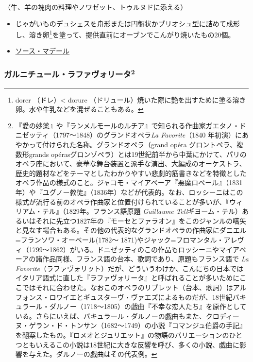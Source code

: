 \begin{recette}
（牛、羊の塊肉の料理やノワゼット、トゥルヌドに添える）

\begin{itemize}
\item
  じゃがいものデュシェスを舟形または円盤状かブリオシュ型に詰めて成形し、溶き卵\footnote{dorer
    （ドレ）\textless{} dorure
    （ドリュール）焼いた際に艶を出すために塗る溶き卵。水や牛乳などを混ぜることもある。}を塗って、提供直前にオーブンでこんがり焼いたもの20個。
\item
  \protect\hyperlink{sauce-madere}{ソース・マデール}
\end{itemize}

\hypertarget{garniture-a-la-favorite}{%
\subsubsection[ガルニチュール・ラファヴォリータ]{\texorpdfstring{ガルニチュール・ラファヴォリータ\footnote{『愛の妙薬』や『ランメルモールのルチア』で知られる作曲家ガエタノ・ドニゼッティ（1797〜1848）のグランドオペラ\emph{La
  Favorite}（1840
  年初演）にあやかって付けられた名称。グランドオペラ（grand opéra
  グロントペラ、複数形grands
  opérasグロンゾペラ）とは19世紀前半から中葉にかけて、パリのオペラ座において、豪華な舞台装置と派手な演出、大編成のオーケストラ、歴史的題材などをテーマとしたわかりやすい悲劇的筋書きなどを特徴としたオペラ作品の様式のこと。ジャコモ・マイアベーア『悪魔ロベール』（1831年）や『ユグノー教徒』（1836年）などが代表的。なお、ロッシーニはこの様式が流行る前のオペラ作曲家と位置付けられていることが多いが、『ウィリアム・テル』（1829年。フランス語原題
  \emph{Guillaume
  Tell}ギヨーム・テル）あるいはそれに先立つ1827年の『モーセとファラオン』をこのジャンルの嚆矢と見なす場合もある。その他の代表的なグランドオペラの作曲家にダニエル=フランソワ・オーベール(1782〜
  1871)やジャック=フロマンタル・アレヴィ（1799〜1862）がいる。ドニゼッティのこの作品もロッシーニやマイアベーアの諸作品同様、フランス語の台本、歌詞であり、原題もフランス語で
  \emph{La
  Favorite}（ラファヴォリット）だが、どういうわけか、こんにちの日本ではイタリア語式に直した『ラファヴォリータ』と呼ばれることが多いためにここではそれに合わせた。なおこのオペラのリブレット（台本、歌詞）はアルフォンス・ロワイエとギュスターヴ・ヴァエズによるものだが、18世紀バキュラール・ダルノー（1718〜1805）の戯曲『不幸な恋人たち』を原作としている。さらにいえば、バキュラール・ダルノーの戯曲もまた、クロディーヌ・ゲラン・ド・トンサン（1682〜1749）の小説『コマンジュ伯爵の手記』を翻案したもの。『ロメオとジュリエット』の物語のバリエーションのひとつともいえるこの小説は18世紀に大きな反響を呼び、多くの小説、戯曲に影響を与えた。ダルノーの戯曲はその代表例。}}{ガルニチュール・ラファヴォリータ}}\label{garniture-a-la-favorite}}


\end{recette}
